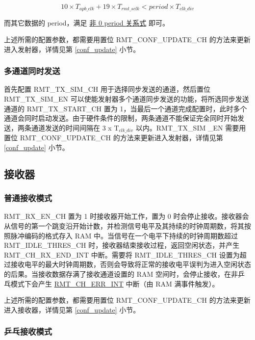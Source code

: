 \documentclass[main\_\_CN.tex]{subfiles}
\begin{document}
\begin{equation}
10 \times T_{apb\_clk} + 19 \times T_{rmt\_sclk} < period \times T_{clk\_div}
\end{equation}

而其它数据的 period，满足 \hyperref[eq:rmt-period-value]{非 0 period 关系式} 即可。

上述所需的配置参数，都需要用置位 RMT\_CONF\_UPDATE\_CH 的方法来更新进入发射器，详情见第 \ref{conf_update} 小节。

\subsubsection{多通道同时发送}

首先配置 RMT\_TX\_SIM\_CH 用于选择同步发送的通道，然后置位 RMT\_TX\_SIM\_EN 可以使能发射器多个通道同步发送的功能，将所选同步发送通道的 RMT\_TX\_START\_CH 置为 1，当最后一个通道完成配置时，此时多个通道会同时启动发送。由于硬件条件的限制，两条通道不能保证完全同时开始发送，两条通道发送的时间间隔在 3 x T$_{clk\_div}$ 以内。RMT\_TX\_SIM \_EN 需要用置位 RMT\_CONF\_UPDATE\_CH 的方法来更新进入发射器，详情见第 \ref{conf_update} 小节。



\subsection{接收器}

\subsubsection{普通接收模式}

RMT\_RX\_EN\_CH 置为 1 时接收器开始工作，置为 0 时会停止接收。接收器会从信号的第一个跳变沿开始计数，并检测信号电平及其持续的时钟周期数，将其按照脉冲编码的格式存入 RAM 中。当信号在一个电平下持续的时钟周期数超过 RMT\_IDLE\_THRES\_CH 时，接收器结束接收过程，返回空闲状态，并产生 RMT\_CH\_RX\_END\_INT 中断。需要将 RMT\_IDLE\_THRES\_CH 设置为超过接收电平的最大时钟周期数，否则会导致将正常的接收电平误判为进入空闲状态的后果。当接收数据存满了接收通道设置的 RAM 空间时，会停止接收，在非乒乓模式下会产生 \hyperref[int:RMTCHnERRINT]{RMT\_CH\_ERR\_INT} 中断（由 RAM 满事件触发）。

上述所需的配置参数，都需要用置位 RMT\_CONF\_UPDATE\_CH 的方法来更新进入接收器，详情见第 \ref{conf_update} 小节。

\subsubsection{乒乓接收模式}
\end{document}
